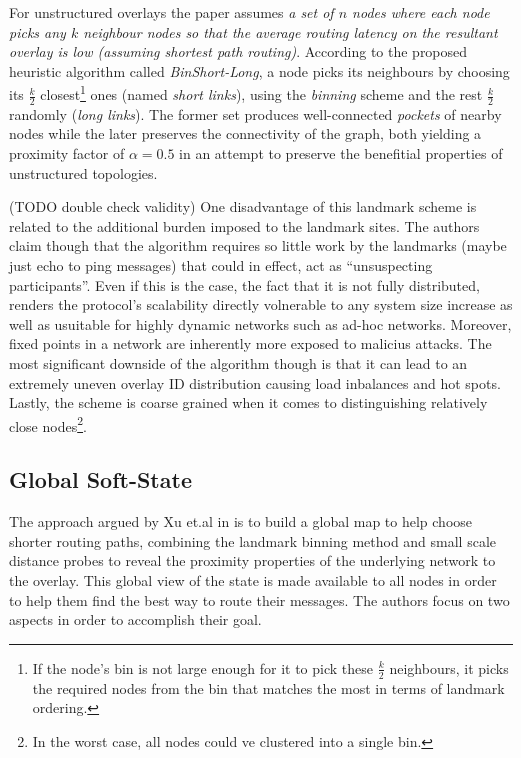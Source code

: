 \documentclass[a4paper,10pt]{article}
\begin{document}
For unstructured overlays the paper assumes \emph{a set of $n$ nodes where each node picks any $k$ neighbour nodes so that the average routing latency on the resultant overlay is low (assuming shortest path routing)}. According to the proposed heuristic algorithm called \emph{BinShort-Long}, a node picks its neighbours by choosing its $\frac{k}{2}$ closest\footnote{If the node's bin is not large enough for it to pick these $\frac{k}{2}$ neighbours, it picks the required nodes from the bin that matches the most in terms of landmark ordering.} ones (named \emph{short links}), using the \emph{binning} scheme and the rest $\frac{k}{2}$ randomly (\emph{long links}). The former set produces well-connected \emph{pockets} of nearby nodes while the later preserves the connectivity of the graph, both yielding a proximity factor of $\alpha = 0.5$ in an attempt to preserve the benefitial properties of unstructured topologies\cite{merugu_str2unstr_2003}.

(TODO double check validity) One disadvantage of this landmark scheme is related to the additional burden imposed to the landmark sites. The authors claim though that the algorithm requires so little work by the landmarks (maybe just echo to ping messages) that could in effect, act as ``unsuspecting participants''. Even if this is the case, the fact that it is not fully distributed, renders the protocol's scalability directly volnerable to any system size increase as well as usuitable for highly dynamic networks such as ad-hoc networks. Moreover, fixed points in a network are inherently more exposed to malicius attacks. The most significant downside of the algorithm though is that it can lead to an extremely uneven overlay ID distribution causing load inbalances and hot spots. Lastly, the scheme is coarse grained when it comes to distinguishing relatively close nodes\footnote{In the worst case, all nodes could ve clustered into a single bin.}.

\subsection{Global Soft-State}
The approach argued by Xu et.al in \cite{xu_globstate_2003} is to build a global map to help choose shorter routing paths, combining the landmark binning method and small scale distance probes to reveal the proximity properties of the underlying network to the overlay. This global view of the state is made available to all nodes in order to help them find the best way to route their messages. The authors focus on two aspects in order to accomplish their goal.
\end{document}
